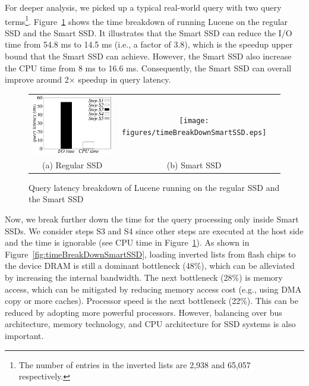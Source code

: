 For deeper analysis, we picked up a typical real-world query with two query terms\footnote{\small The number of entries in the inverted lists are 2,938 and 65,057 respectively.}. Figure~\ref{fig:timeBreakDownRegSmart} shows the time breakdown of running Lucene on the regular SSD and the Smart SSD.
It illustrates  that the Smart SSD can reduce the I/O time from 54.8 ms to 14.5 ms (i.e., a factor of 3.8), which is the speedup upper bound that the Smart SSD can achieve. However, the Smart SSD also increase the CPU time from 8 ms to 16.6 ms. Consequently, the Smart SSD can overall improve around 2$\times$ speedup in query latency.


\begin{figure}[tbp]
  \centering
  \renewcommand{\tabcolsep}{0.1mm}
  \begin{tabular}{ccc}
 \includegraphics[width=0.5\columnwidth]{figures/timeBreakDownRegularSSD2.eps}&
  \texttt{[image: figures/timeBreakDownSmartSSD.eps]}\\
  (a) Regular SSD & (b) Smart SSD
\end{tabular}
  \caption{Query latency breakdown of Lucene running on the regular SSD and the Smart SSD}
  \label{fig:timeBreakDownRegSmart}
 \end{figure}


Now, we break further down the time for the query processing only inside Smart SSDs.  We consider steps S3 and S4 since other steps are executed at the host side and the time is ignorable (see CPU time in Figure~\ref{fig:timeBreakDownRegSmart}).
As shown in Figure~\ref{fig:timeBreakDownSmartSSD}, loading inverted lists from flash chips to the device DRAM is still a dominant bottleneck (48\%), which can be alleviated by increasing the internal bandwidth. The next bottleneck (28\%) is memory access, which can be mitigated by reducing memory access cost (e.g., using DMA copy or more caches). Processor speed is the next bottleneck (22\%). This can be reduced by adopting more powerful processors. However, balancing over bus architecture, memory technology, and CPU architecture for SSD systems is also important.


